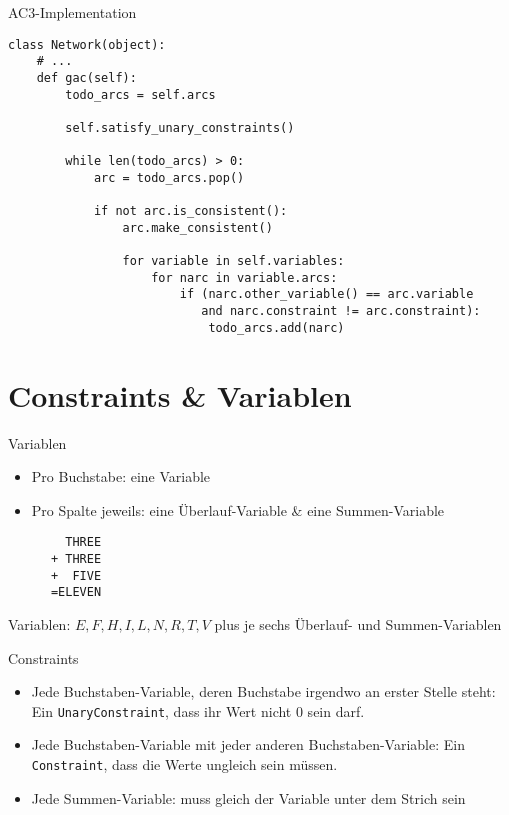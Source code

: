 \documentclass[10pt]{beamer}
\begin{document}
\begin{frame}[fragile]{AC3-Implementation}
    \begin{verbatim}
class Network(object):
    # ...
    def gac(self):
        todo_arcs = self.arcs

        self.satisfy_unary_constraints()

        while len(todo_arcs) > 0:
            arc = todo_arcs.pop()

            if not arc.is_consistent():
                arc.make_consistent()

                for variable in self.variables:
                    for narc in variable.arcs:
                        if (narc.other_variable() == arc.variable
                           and narc.constraint != arc.constraint):
                            todo_arcs.add(narc)
    \end{verbatim}
\end{frame}

\section{Constraints \& Variablen}

\begin{frame}[fragile]{Variablen}
    \begin{itemize}
        \item Pro Buchstabe: eine Variable
        \item Pro Spalte jeweils: eine Überlauf-Variable \& eine Summen-Variable
    \end{itemize}
\end{frame}

\begin{frame}[fragile]{}

\begin{BVerbatim}
        THREE
      + THREE
      +  FIVE
      =ELEVEN
\end{BVerbatim}

Variablen: $ {E, F, H, I, L, N, R, T, V} $ plus je sechs Überlauf- und Summen-Variablen

\end{frame}

\begin{frame}[fragile]{Constraints}
    \begin{itemize}
        \item Jede Buchstaben-Variable, deren Buchstabe irgendwo an erster Stelle steht:
            Ein \texttt{UnaryConstraint}, dass ihr Wert nicht 0 sein darf.
        \item Jede Buchstaben-Variable mit jeder anderen Buchstaben-Variable:
            Ein \texttt{Constraint}, dass die Werte ungleich sein müssen.
        \item Jede Summen-Variable: muss gleich der Variable unter dem Strich sein
            \Lightning
    \end{itemize}
\end{frame}
\end{document}

